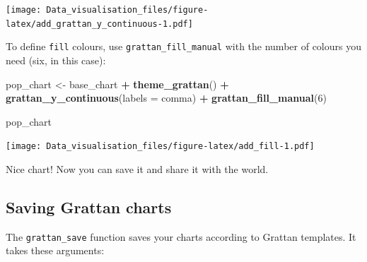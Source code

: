 \documentclass[]{book}
\newenvironment{Shaded}{\begin{snugshade}}{\end{snugshade}}
\newcommand{\DataTypeTok}[1]{\textcolor[rgb]{0.13,0.29,0.53}{#1}}
\newcommand{\DecValTok}[1]{\textcolor[rgb]{0.00,0.00,0.81}{#1}}
\newcommand{\KeywordTok}[1]{\textcolor[rgb]{0.13,0.29,0.53}{\textbf{#1}}}
\newcommand{\NormalTok}[1]{#1}
\newcommand{\OperatorTok}[1]{\textcolor[rgb]{0.81,0.36,0.00}{\textbf{#1}}}
\newcommand{\StringTok}[1]{\textcolor[rgb]{0.31,0.60,0.02}{#1}}
\begin{document}
\texttt{[image: Data\_visualisation\_files/figure-latex/add\_grattan\_y\_continuous-1.pdf]}

To define \texttt{fill} colours, use \texttt{grattan\_fill\_manual} with the number of colours you need (six, in this case):

\begin{Shaded}
\begin{Highlighting}[]
\NormalTok{pop_chart <-}\StringTok{ }\NormalTok{base_chart }\OperatorTok{+}
\StringTok{        }\KeywordTok{theme_grattan}\NormalTok{() }\OperatorTok{+}
\StringTok{        }\KeywordTok{grattan_y_continuous}\NormalTok{(}\DataTypeTok{labels =}\NormalTok{ comma) }\OperatorTok{+}
\StringTok{        }\KeywordTok{grattan_fill_manual}\NormalTok{(}\DecValTok{6}\NormalTok{)}

\NormalTok{pop_chart}
\end{Highlighting}
\end{Shaded}

\texttt{[image: Data\_visualisation\_files/figure-latex/add\_fill-1.pdf]}

Nice chart! Now you can save it and share it with the world.

\hypertarget{saving-grattan-charts}{%
\subsection{Saving Grattan charts}\label{saving-grattan-charts}}

The \texttt{grattan\_save} function saves your charts according to Grattan templates. It takes these arguments:
\end{document}
